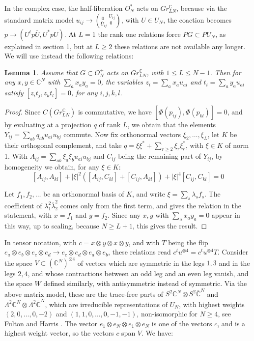 \documentclass[11pt]{article}
\theoremstyle{plain}
\newtheorem{lemma}[theorem]{Lemma}
\begin{document}
In the complex case, the half-liberation $O_N^*$ acts on $Gr^\mathbb C_{LN}$, because via the standard matrix model $u_{ij}\to(^{\ 0\ }_{\bar{U}_{ij}}{\ }^{U_{ij}}_{\ 0\ })$, with $U\in U_N$, the coaction becomes $p\to(U^tp\bar{U},U^*pU)$. At $L=1$ the rank one relations force $PG\subset PU_N$, as explained in section 1, but at $L\geq2$ these relations are not available any longer. We will use instead the following relations:

\begin{lemma}
\label{lem:isotropic}
Assume that $G\subset O_N^+$ acts on $Gr^\mathbb C_{LN}$, with $1\leq L\leq N-1$. Then for any $x,y\in\mathbb C^N$ with $\sum_ax_ay_a=0$, the variables $z_i=\sum_ax_au_{ai}$ and $t_i=\sum_ay_au_{ai}$ satisfy $[z_it_j,z_kt_l]=0$, for any $i,j,k,l$.
\end{lemma}

\begin{proof}
Since $C(Gr^\mathbb C_{LN})$ is commutative, we have $[\Phi(p_{ij}),\Phi(p_{kl})]=0$, and by evaluating at a projection $q$ of rank $L$, we obtain that the elements $Y_{ij}=\sum_{ab}q_{ab}u_{ai}u_{bj}$ commute. Now fix orthonormal vectors $\xi_2,\ldots,\xi_L$, let $K$ be their orthogonal complement, and take $q=\xi\xi^*+\sum_{r\geq2}\xi_r\xi_r^*$, with $\xi\in K$ of norm 1. With $A_{ij}=\sum_{ab}\xi_a\bar{\xi}_bu_{ai}u_{bj}$ and $C_{ij}$ being the remaining part of $Y_{ij}$, by homogeneity we obtain, for any $\xi\in K$:
$$[A_{ij},A_{kl}]+|\xi|^2([A_{ij},C_{kl}]+[C_{ij},A_{kl}])+|\xi|^4[C_{ij},C_{kl}]=0$$

Let $f_1,f_2,\ldots$ be an orthonormal basis of $K$, and write $\xi=\sum_s\lambda_sf_s$. The coefficient of $\lambda_1^2\bar{\lambda}_2^2$ comes only from the first term, and gives the relation in the statement, with $x=f_1$ and $y=\bar{f}_2$. Since any $x,y$ with $\sum_ax_ay_a=0$ appear in this way, up to scaling, because $N\geq L+1$, this gives the result.
\end{proof}

In tensor notation, with $c=x\otimes y\otimes x\otimes y$, and with $T$ being the flip $e_a\otimes e_b\otimes e_c\otimes e_d\to e_c\otimes e_d\otimes e_a\otimes e_b$, these relations read $c^tu^{\otimes4}=c^tu^{\otimes4}T$. Consider the space $V\subset(\mathbb C^N)^{\otimes4}$ of vectors which are symmetric in the legs $1,3$ and in the legs $2,4$, and whose contractions between an odd leg and an even leg vanish, and the space $W$ defined similarly, with antisymmetric instead of symmetric. Via the above matrix model, these are the trace-free parts of $S^2\mathbb C^N\otimes S^2\overline{\mathbb C}^N$ and $\Lambda^2\mathbb C^N\otimes\Lambda^2\overline{\mathbb C}^N$, which are irreducible representations of $U_N$, with highest weights $(2,0,\ldots,0,-2)$ and $(1,1,0,\ldots,0,-1,-1)$, non-isomorphic for $N\geq4$, see Fulton and Harris \cite{fha}. The vector $e_1\otimes e_N\otimes e_1\otimes e_N$ is one of the vectors $c$, and is a highest weight vector, so the vectors $c$ span $V$. We have:
\end{document}
